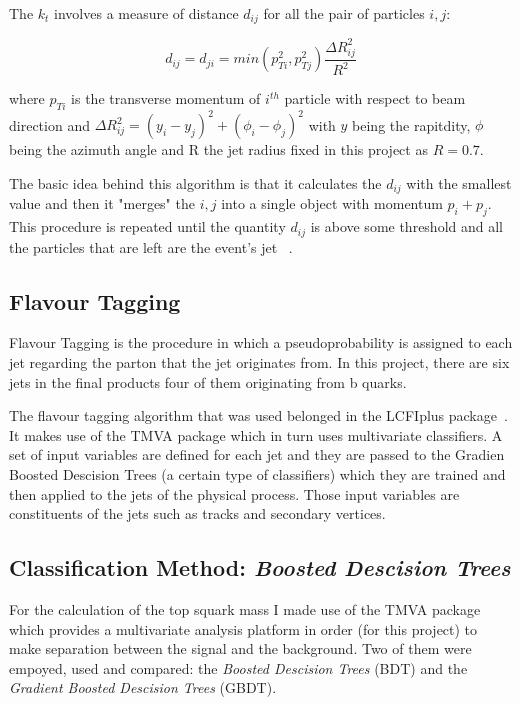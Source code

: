 \documentclass[12pt,a4paper]{report}
\begin{document}
The $k_{t}$ involves a measure of distance $d_{ij}$ for all the pair of particles $i,j$:

\begin{equation}
 d_{ij}=d_{ji}=min(p_{Ti}^{2},p_{Tj}^{2})\frac{\Delta R^{2}_{ij}}{R^{2}}
\end{equation}


where $p_{Ti}$ is the transverse momentum of $i^{th}$ particle with respect to beam direction and 
$\Delta R^{2}_{ij}=(y_{i}-y_{j})^{2}+(\phi_{i}-\phi_{j})^{2}$ with $y$ being the rapitdity, $\phi$ being
the azimuth angle and R the jet radius fixed in this project as $R=0.7$.

The basic idea behind this algorithm is that it calculates the $d_{ij}$ with the smallest value and then it 
"merges" the $i,j$ into a single object with momentum $p_{i}+p_{j}$. This procedure is repeated until the quantity
$d_{ij}$ is above some threshold and all the particles that are left are the event's jet
~\cite{cacciari2012fastjet}.

\subsection{Flavour Tagging}

Flavour Tagging is the procedure in which a pseudoprobability is assigned to each jet regarding the parton
that the jet originates from. In this project, there are six jets in the final products four of them 
originating from b quarks. 

The flavour tagging algorithm that was used belonged in the LCFIplus package~\cite{suehara2016lcfiplus}.
It  makes use of the TMVA package which in turn uses multivariate classifiers. A set of input variables are 
defined for each jet and they are passed to the Gradien Boosted Descision Trees (a certain type of classifiers)
which they are trained and then applied to the jets of the physical process. Those input variables are
constituents of the jets such as tracks and secondary vertices.

\subsection{Classification Method: \textit{Boosted Descision Trees}}

For the calculation of the top squark mass I made use of the TMVA package which provides a multivariate 
analysis platform in order (for this project) to make separation between the signal and the background. Two 
of them were empoyed, used and compared: the \textit{Boosted Descision Trees} (BDT) and the 
\textit{Gradient Boosted Descision Trees} (GBDT).
\end{document}
